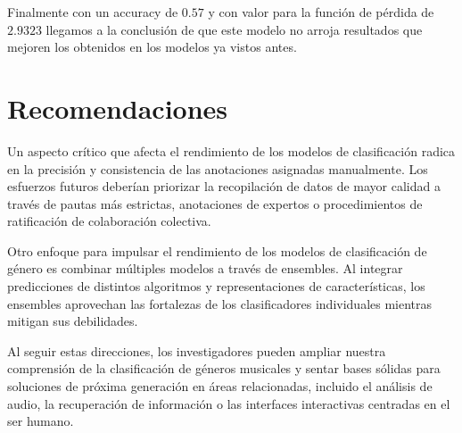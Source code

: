 \documentclass[colorinlistoftodos,twoside,twocolumn,10pt]{article} %
\begin{document}
Finalmente con un accuracy de $0.57$ y con valor para la funci\'on de p\'erdida de  $2.9323$ llegamos a la conclusi\'on de que este modelo no arroja resultados que mejoren los obtenidos en los modelos ya vistos antes.

	\section{Recomendaciones}
  
Un aspecto cr\'itico que afecta el rendimiento de los modelos de clasificaci\'on radica en la precisi\'on y consistencia de las anotaciones asignadas manualmente. Los esfuerzos futuros deber\'ian priorizar la recopilaci\'on de datos de mayor calidad a trav\'es de pautas m\'as estrictas, anotaciones de expertos o procedimientos de ratificaci\'on de colaboraci\'on colectiva.

Otro enfoque para impulsar el rendimiento de los modelos de clasificaci\'on de g\'enero es combinar m\'ultiples modelos a trav\'es de ensembles. Al integrar predicciones de distintos algoritmos y representaciones de caracter\'isticas, los ensembles aprovechan las fortalezas de los clasificadores individuales mientras mitigan sus debilidades.  

  Al seguir estas direcciones, los investigadores pueden ampliar nuestra comprensi\'on de la clasificaci\'on de g\'eneros musicales y sentar bases s\'olidas para soluciones de pr\'oxima generaci\'on en \'areas relacionadas, incluido el an\'alisis de audio, la recuperaci\'on de informaci\'on o las interfaces interactivas centradas en el ser humano.
  
\end{document}
